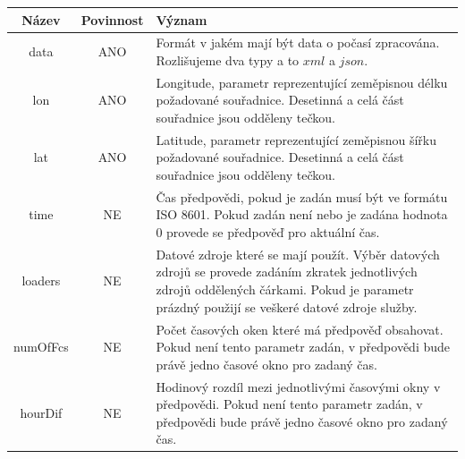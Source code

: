 \documentclass[czech,bachelor,dept460,male,csharp,cpdeclaration]{diploma}
\begin{document}
	\begin{center}
		
		
		\begin{tabular}{c c p{13cm}}
			Název & Povinnost & Význam \\
			\midrule
			data & ANO & Formát v jakém mají být data o počasí zpracována. Rozlišujeme dva typy a to $xml$ a $json$.\\
			lon & ANO & Longitude, parametr reprezentující zeměpisnou délku požadované souřadnice. Desetinná a celá část souřadnice jsou odděleny tečkou.\\
			lat & ANO & Latitude, parametr reprezentující zeměpisnou šířku požadované souřadnice. Desetinná a celá část souřadnice jsou odděleny tečkou.\\
			time & NE & Čas předpovědi, pokud je zadán musí být ve formátu ISO 8601. Pokud zadán není nebo je zadána hodnota 0  provede se předpověď pro aktuální čas.\\ 
			loaders & NE & Datové zdroje které se mají použít. Výběr datových zdrojů se provede zadáním zkratek jednotlivých zdrojů oddělených čárkami. Pokud je parametr prázdný použijí se veškeré datové zdroje služby. \\
			numOfFcs & NE & Počet časových oken které má předpověď obsahovat. Pokud není tento parametr zadán, v předpovědi bude právě jedno časové okno pro zadaný čas.\\
			hourDif & NE & Hodinový rozdíl mezi jednotlivými časovými okny v předpovědi. Pokud není tento parametr zadán, v předpovědi bude právě jedno časové okno pro zadaný čas.\\
		\end{tabular}
	\end{center}
	
\end{document}
